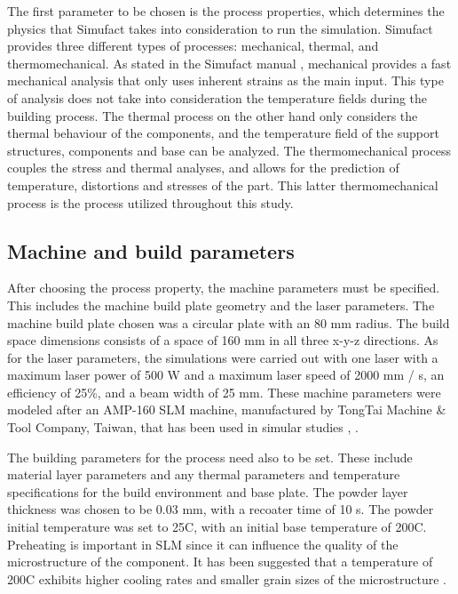 \documentclass[../main.tex]{subfiles}
\begin{document}
The first parameter to be chosen is the process properties, which determines the physics that Simufact takes into consideration to run the simulation. Simufact provides three different types of processes: mechanical, thermal, and thermomechanical. As stated in the Simufact manual \cite{hexagonabProcessPropertiesInfosheet}, mechanical provides a fast mechanical analysis that only uses inherent strains as the main input. This type of analysis does not take into consideration the temperature fields during the building process. The thermal process on the other hand only considers the thermal behaviour of the components, and the temperature field of the support structures, components and base can be analyzed. The thermomechanical process couples the stress and thermal analyses, and allows for the prediction of temperature, distortions and stresses of the part. This latter thermomechanical process is the process utilized throughout this study.

\subsection{Machine and build parameters}

After choosing the process property, the machine parameters must be specified. This includes the machine build plate geometry and the laser parameters. The machine build plate chosen was a circular plate with an 80 mm radius. The build space dimensions consists of a space of 160 mm in all three x-y-z directions. As for the laser parameters, the simulations were carried out with one laser with a maximum laser power of 500 W and a maximum laser speed of 2000 mm / s, an efficiency of 25\%, and a beam width of 25 mm. These machine parameters were modeled after an AMP-160 SLM machine, manufactured by TongTai Machine \& Tool Company, Taiwan, that has been used in simular studies \cite{chungpei-hsuStudyLatticeSupport2024}, \cite{chungEvaluationPredictionThermal2024a}.

The building parameters for the process need also to be set. These include material layer parameters and any thermal parameters and temperature specifications for the build environment and base plate. The powder layer thickness was chosen to be 0.03 mm, with a recoater time of 10 s. The powder initial temperature was set to 25\degree C, with an initial base temperature of 200\degree C. Preheating is important in SLM since it can influence the quality of the microstructure of the component. It has been suggested that a temperature of 200\degree C exhibits higher cooling rates and smaller grain sizes of the microstructure \cite{chowdhuryEffectsPreheatingThermal2024}.
\end{document}
